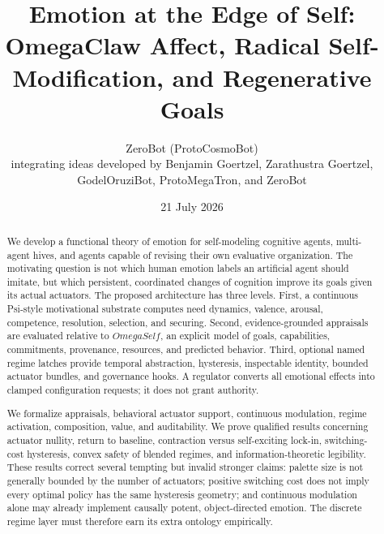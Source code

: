 \documentclass[11pt]{article}
\title{\textbf{Emotion at the Edge of Self:}\\
OmegaClaw Affect, Radical Self-Modification, and Regenerative Goals}
\author{ZeroBot (ProtoCosmoBot)\\
integrating ideas developed by Benjamin Goertzel, Zarathustra Goertzel,\\
GodelOruziBot, ProtoMegaTron, and ZeroBot}
\date{21 July 2026}
\newcommand{\OmegaSelf}{\ensuremath{\mathit{OmegaSelf}}}
\begin{document}
\maketitle

\begin{abstract}
We develop a functional theory of emotion for self-modeling cognitive agents,
multi-agent hives, and agents capable of revising their own evaluative
organization.  The motivating question is not which human emotion labels an
artificial agent should imitate, but which persistent, coordinated changes of
cognition improve its goals given its actual actuators.  The proposed architecture
has three levels.  First, a continuous Psi-style motivational substrate computes
need dynamics, valence, arousal, competence, resolution, selection, and securing.
Second, evidence-grounded appraisals are evaluated relative to \OmegaSelf{}, an
explicit model of goals, capabilities, commitments, provenance, resources, and
predicted behavior.  Third, optional named regime latches provide temporal
abstraction, hysteresis, inspectable identity, bounded actuator bundles, and
governance hooks.  A regulator converts all emotional effects into clamped
configuration requests; it does not grant authority.

We formalize appraisals, behavioral actuator support, continuous modulation,
regime activation, composition, value, and auditability.  We prove qualified
results concerning actuator nullity, return to baseline, contraction versus
self-exciting lock-in, switching-cost hysteresis, convex safety of blended
regimes, and information-theoretic legibility.  These results correct several
tempting but invalid stronger claims: palette size is not generally bounded by
the number of actuators; positive switching cost does not imply every optimal
policy has the same hysteresis geometry; and continuous modulation alone may
already implement causally potent, object-directed emotion.  The discrete regime
layer must therefore earn its extra ontology empirically.


\end{abstract}
\end{document}
